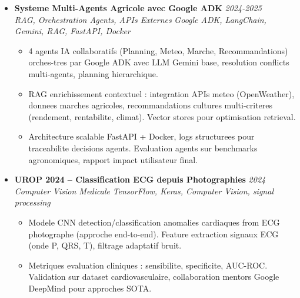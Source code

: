 \documentclass[a4paper,11pt]{article}
\begin{document}
\begin{itemize}[leftmargin=*, label={-}]
\item \textbf{Systeme Multi-Agents Agricole avec Google ADK} \hfill \textit{2024-2025} \\
\textit{RAG, Orchestration Agents, APIs Externes} \hfill \textit{Google ADK, LangChain, Gemini, RAG, FastAPI, Docker}
\vspace{-2pt}
    \begin{itemize}[leftmargin=0.4cm, nosep, label=\tiny$\bullet$]
        \item \small{4 agents IA collaboratifs (Planning, Meteo, Marche, Recommandations) orches-tres par Google ADK avec LLM Gemini base, resolution conflicts multi-agents, planning hierarchique.}
        \item \small{RAG enrichissement contextuel : integration APIs meteo (OpenWeather), donnees marches agricoles, recommandations cultures multi-criteres (rendement, rentabilite, climat). Vector stores pour optimisation retrieval.}
        \item \small{Architecture scalable FastAPI + Docker, logs structurees pour traceabilite decisions agents. Evaluation agents sur benchmarks agronomiques, rapport impact utilisateur final.}
    \end{itemize}
\vspace{3pt}

\item \textbf{UROP 2024 -- Classification ECG depuis Photographies} \hfill \textit{2024} \\
\textit{Computer Vision Medicale} \hfill \textit{TensorFlow, Keras, Computer Vision, signal processing}
\vspace{-2pt}
    \begin{itemize}[leftmargin=0.4cm, nosep, label=\tiny$\bullet$]
        \item \small{Modele CNN detection/classification anomalies cardiaques from ECG photographe (approche end-to-end). Feature extraction signaux ECG (onde P, QRS, T), filtrage adaptatif bruit.}
        \item \small{Metriques evaluation cliniques : sensibilite, specificite, AUC-ROC. Validation sur dataset cardiovasculaire, collaboration mentors Google DeepMind pour approches SOTA.}
    \end{itemize}
\vspace{3pt}


\end{itemize}
\end{document}
